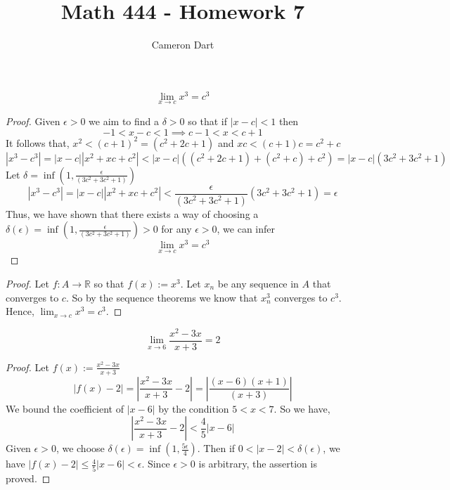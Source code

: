 \documentclass[12pt]{article}
\newcommand{\R}{\mathbb{R}}
\newenvironment{claim}[2][Claim]{\begin{trivlist}
		\item[\hskip \labelsep {\bfseries #1}\hskip \labelsep {\bfseries #2}]}{\end{trivlist}}
\begin{document}
	\title{Math 444 - Homework 7}
	\author{Cameron Dart}
	\maketitle

\begin{claim}{4.1.7}
	\[  \lim_{x \rightarrow c} x^3 = c^3  \]
\end{claim}

\begin{proof}
	Given $\epsilon > 0$ we aim to find a $\delta > 0$ so that if $|x - c| < 1$ then
	\[ -1 < x - c < 1 \implies c - 1 < x < c + 1 \]
	It follows that, $x^2 < (c + 1) ^2 = (c^2 + 2c + 1)$ and $xc < (c + 1)c = c^2 + c$ 
	\[ 
	  |x^3 - c^3| = |x - c| |x^2 + xc + c^2| < | x - c | ((c^2 + 2c + 1) + (c^2 + c) + c^2) = |x - c| (3c^2 + 3c^2 + 1)
	\]
	Let $\delta = \inf(1, \frac{\epsilon}{(3c^2 + 3c^2 + 1)})$\\
	\[
	|x^3 - c^3| = |x - c| |x^2 + xc + c^2| <  \frac{\epsilon}{(3c^2 + 3c^2 + 1)}  (3c^2 + 3c^2 + 1) = \epsilon
	\]
	Thus, we have shown that there exists a way of choosing a $\delta(\epsilon) = \inf(1,  
	\frac{\epsilon}{(3c^2 + 3c^2 + 1)})> 0$ for any $\epsilon > 0$, we can infer 
	 \[ \lim_{x \rightarrow c} x^3 = c^3  \]
\end{proof}

\begin{proof}
	Let $f: A \rightarrow \R$ so that $f(x):=x^3$. Let $x_n$ be any sequence in $A$ that converges to $c$. So by the sequence theorems we know that $x_n^3$ converges to $c^3$. Hence,
	$\lim_{x \rightarrow c} x^3 = c^3$.
\end{proof}

\begin{claim}{4.1.11b}
	\[
		\lim_{x \rightarrow 6} \frac{x^2 - 3x}{x + 3} = 2
	\]
\end{claim}
\begin{proof}
	Let $f(x):= \frac{x^2 - 3x}{x + 3} $
	\[
		|f(x) - 2| = \left |\frac{x^2 - 3x}{x + 3} - 2 \right | = \left | \frac{(x-6)(x+1) }{(x+3)} \right | 
	\]
	We bound the coefficient of $|x-6|$ by the condition $5 < x < 7$. So we have,
	\[
	 \left |\frac{x^2 - 3x}{x + 3} - 2 \right | < \frac{4}{5} |x - 6|	
	\]
	Given $\epsilon > 0$, we choose $\delta(\epsilon) = \inf (1,\frac{5\epsilon}{4})$. Then if $0 < |x - 2| < \delta(\epsilon)$, we have $|f(x) - 2| \leq \frac{4}{5}|x - 6| < \epsilon$. Since $\epsilon > 0$ is arbitrary, the assertion is proved. 
\end{proof}
\end{document}
